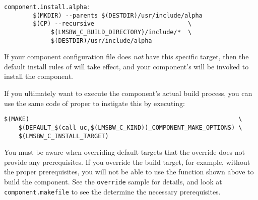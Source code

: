 \begin{verbatim}
component.install.alpha:
        $(MKDIR) --parents $(DESTDIR)/usr/include/alpha
        $(CP) --recursive                          \
             $(LMSBW_C_BUILD_DIRECTORY)/include/*  \
             $(DESTDIR)/usr/include/alpha
\end{verbatim}

If your component configuration file does \emph{not} have this
specific target, then the default install rules of \lmsbw will take
effect, and your component's \makefile will be invoked to install the
component.

If you ultimately want to execute the component's actual build
process, you can use the same code of \lmsbw proper to instigate this
by executing:

\begin{verbatim}
$(MAKE)                                                          \
    $(DEFAULT_$(call uc,$(LMSBW_C_KIND))_COMPONENT_MAKE_OPTIONS) \
    $(LMSBW_C_INSTALL_TARGET)
\end{verbatim}


You must be aware when overriding default targets that the override
does not provide any prerequisites.  If you override the build target,
for example, without the proper prerequisites, you will not be able to
use the function shown above to build the component.  See the
\texttt{override} sample for details, and look at
\texttt{component.makefile} to see the determine the necessary
prerequisites.

